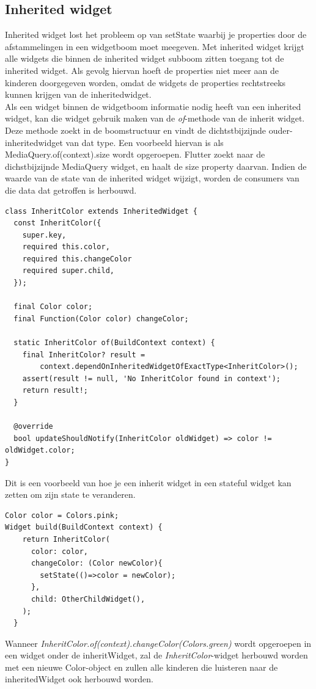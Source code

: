\subsection{{Inherited widget}}%
\label{sec:Inherited widget}
Inherited widget lost het probleem op van setState waarbij je properties door de afstammelingen in een widgetboom moet meegeven. Met inherited widget krijgt alle widgets die binnen
de inherited widget subboom zitten toegang tot de inherited widget. Als gevolg hiervan hoeft de properties niet meer aan de kinderen doorgegeven worden, omdat de widgets de properties rechtstreeks kunnen krijgen van de inheritedwidget. \autocite{windmill2020}
\\ 
Als een widget binnen de widgetboom informatie nodig heeft van een inherited widget, kan die widget gebruik maken van de \textit{of}-methode van de inherit widget. Deze methode zoekt in de boomstructuur en vindt de dichtstbijzijnde ouder-inheritedwidget van dat type. 
Een voorbeeld hiervan is als MediaQuery.of(context).size wordt opgeroepen. Flutter zoekt naar de dichstbijzijnde MediaQuery widget, en haalt de size property daarvan. Indien de waarde van de state van de inherited widget wijzigt, worden de consumers van die data dat getroffen is herbouwd.
\\
\begin{verbatim} 
class InheritColor extends InheritedWidget {
  const InheritColor({
    super.key,
    required this.color,
    required this.changeColor
    required super.child,
  });

  final Color color;
  final Function(Color color) changeColor;

  static InheritColor of(BuildContext context) {
    final InheritColor? result =
        context.dependOnInheritedWidgetOfExactType<InheritColor>();
    assert(result != null, 'No InheritColor found in context');
    return result!;
  }

  @override
  bool updateShouldNotify(InheritColor oldWidget) => color != oldWidget.color;
}
\end{verbatim}

Dit is een voorbeeld van hoe je een inherit widget in een stateful widget kan zetten om zijn state te veranderen.  
\begin{verbatim}
Color color = Colors.pink;
Widget build(BuildContext context) {
    return InheritColor(
      color: color,
      changeColor: (Color newColor){
        setState(()=>color = newColor);
      },
      child: OtherChildWidget(),
    );
  }
\end{verbatim}
Wanneer \textit{InheritColor.of(context).changeColor(Colors.green)}  wordt opgeroepen in een widget onder de inheritWidget, zal de \textit{InheritColor}-widget herbouwd worden met een nieuwe Color-object en zullen alle kinderen die luisteren naar de inheritedWidget ook herbouwd worden.
\hfill
\\

